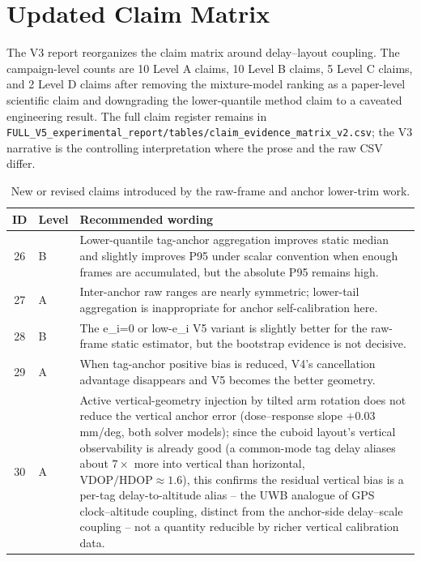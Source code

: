 \documentclass[11pt,a4paper]{article}
\begin{document}
\section{Updated Claim Matrix}

The V3 report reorganizes the claim matrix around delay--layout coupling. The campaign-level counts are 10 Level A claims, 10 Level B claims, 5 Level C claims, and 2 Level D claims after removing the mixture-model ranking as a paper-level scientific claim and downgrading the lower-quantile method claim to a caveated engineering result. The full claim register remains in \texttt{FULL\_V5\_experimental\_report/tables/claim\_evidence\_matrix\_v2.csv}; the V3 narrative is the controlling interpretation where the prose and the raw CSV differ.

\begin{table}[H]
\centering
\caption{New or revised claims introduced by the raw-frame and anchor lower-trim work.}
\label{tab:new_claims}
\small
\begin{tabular}{@{}clp{112mm}@{}}
\toprule
ID & Level & Recommended wording \\
\midrule
26 & B & Lower-quantile tag-anchor aggregation improves static median and slightly improves P95 under scalar convention when enough frames are accumulated, but the absolute P95 remains high. \\
27 & A & Inter-anchor raw ranges are nearly symmetric; lower-tail aggregation is inappropriate for anchor self-calibration here. \\
28 & B & The e\_i=0 or low-e\_i V5 variant is slightly better for the raw-frame static estimator, but the bootstrap evidence is not decisive. \\
29 & A & When tag-anchor positive bias is reduced, V4's cancellation advantage disappears and V5 becomes the better geometry. \\
30 & A & Active vertical-geometry injection by tilted arm rotation does not reduce the vertical anchor error (dose--response slope $+0.03$ mm/deg, both solver models); since the cuboid layout's vertical observability is already good (a common-mode tag delay aliases about $7\times$ more into vertical than horizontal, $\mathrm{VDOP}/\mathrm{HDOP}\approx1.6$), this confirms the residual vertical bias is a per-tag delay-to-altitude alias -- the UWB analogue of GPS clock--altitude coupling, distinct from the anchor-side delay--scale coupling -- not a quantity reducible by richer vertical calibration data. \\
\bottomrule
\end{tabular}
\end{table}
\end{document}
